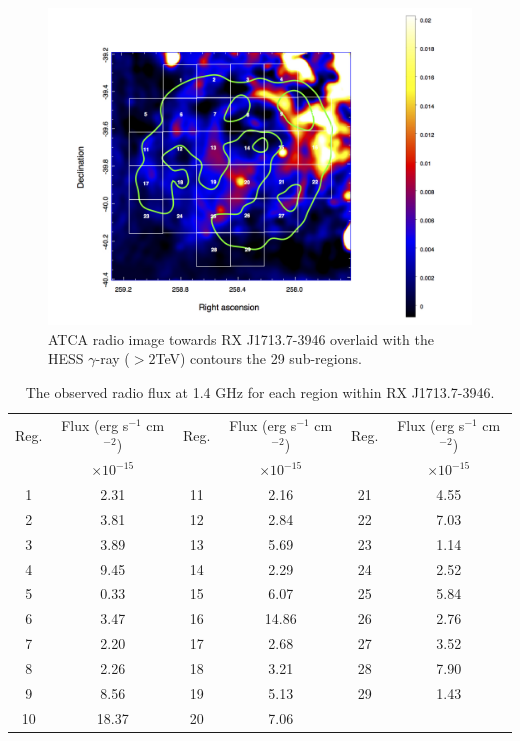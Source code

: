 \documentclass[12pt,a4paper]{article}
\begin{document}
\begin{figure}[H]
	\centering
	\includegraphics[width=0.75\linewidth, height=0.35\textheight]{atca_map}
	\caption{ATCA radio image towards RX J1713.7-3946 overlaid with the HESS $\gamma$-ray ($>2$TeV) contours the 29 sub-regions.}
	\label{fig:atcaradiomap}
\end{figure}
\begin{table}[H] 
	\begin{center}
		\begin{tabular}{cccccc}
			\toprule
			Reg. & Flux (erg s$^{-1}$ cm$^{-2}$) & Reg. & Flux (erg s$^{-1}$ cm$^{-2}$) & Reg. & Flux (erg s$^{-1}$ cm$^{-2}$) \\ 	
			& $\times 10^{-15}$ && $\times 10^{-15}$ && $\times 10^{-15}$ \\
			\hline 
			1& 2.31  & 11 & 2.16  & 21 & 4.55   \\ 
			2& 3.81   & 12 & 2.84  & 22 & 7.03   \\ 
			3& 3.89  & 13 & 5.69  & 23 & 1.14  \\ 
			4& 9.45  & 14 & 2.29  & 24 & 2.52  \\ 
			5& 0.33   & 15 & 6.07 & 25 & 5.84   \\ 
			6& 3.47   & 16 & 14.86  & 26 & 2.76   \\ 
			7& 2.20  & 17 & 2.68  & 27 & 3.52   \\ 
			8& 2.26   & 18 & 3.21  & 28 & 7.90   \\ 
			9& 8.56   & 19 & 5.13  & 29 & 1.43   \\ 
			10& 18.37   & 20 & 7.06  && \\ 
			\bottomrule
		\end{tabular} 
	\end{center}
	\caption{The observed radio flux at 1.4 GHz for each region within RX J1713.7-3946.}
	\label{tab:atcaobvs}
\end{table}
\end{document}
